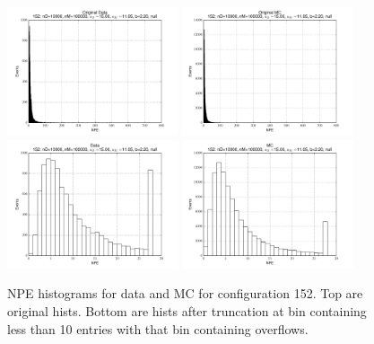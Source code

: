  \begin{figure}[htbp] \begin{center} 
\includegraphics[width=0.45\textwidth]{../FIGURES/152/FIG_Original_Data.pdf} 
\includegraphics[width=0.45\textwidth]{../FIGURES/152/FIG_Original_MC.pdf} 
\includegraphics[width=0.45\textwidth]{../FIGURES/152/FIG_Data.pdf} 
\includegraphics[width=0.45\textwidth]{../FIGURES/152/FIG_MC.pdf} 
\caption{NPE histograms for data and MC for configuration 152. Top are original hists. Bottom are hists after truncation at bin containing less than 10 entries with that bin containing overflows.} 
\label{tab:npe_152} 
\end{center} \end{figure} 
\clearpage
 